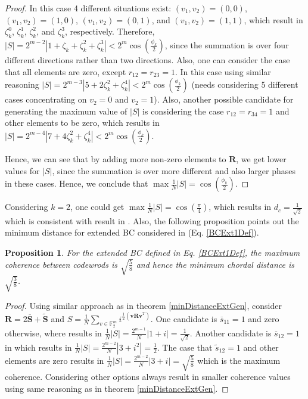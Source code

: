 \documentclass[lettersize,journal,onecolumn]{IEEEtran}
\newtheorem{proposition}{Proposition}
\begin{document}
\begin{proof}
In this case 4 different situations exist: $\left(v_1,v_2\right)=\left(0,0\right)$, $\left(v_1,v_2\right)=\left(1,0\right)$, $\left(v_1,v_2\right)=\left(0,1\right)$, and $\left(v_1,v_2\right)=\left(1,1\right)$, which result in $\zeta_k^0$, $\zeta_k^1$, $\zeta_k^2$, and $\zeta_k^3$, respectively. Therefore, $\left\lvert S \right\rvert = 2^{m-2}\left\lvert 1+\zeta_k+\zeta_k^2+\zeta_k^3 \right\rvert < 2^m \cos\left(\frac{\phi_k}{2}\right)$, since the summation is over four different directions rather than two directions. Also, one can consider the case that all elements are zero, except $r_{12}=r_{23}=1$. In this case using similar reasoning $\left\lvert S \right\rvert = 2^{m-3}\left\lvert 5+2\zeta_k^2+\zeta_k^4 \right\rvert < 2^m \cos\left(\frac{\phi_k}{2}\right)$ (needs considering 5 different cases concentrating on $v_2=0$ and $v_2=1$). Also, another possible candidate for generating the maximum value of $\left\lvert S \right\rvert$ is considering the case $r_{12}=r_{34}=1$ and other elements to be zero, which results in $\left\lvert S \right\rvert = 2^{m-4} \left\lvert 7+4\zeta_k^2+\zeta_k^4 \right\rvert< 2^m \cos\left(\frac{\phi_k}{2}\right)$.

Hence, we can see that by adding more non-zero elements to $\mathbf{R}$, we get lower values for $\left\lvert S \right\rvert$, since the summation is over more different and also larger phases in these cases. Hence, we conclude that ${\max}\frac{1}{N}\left\lvert S \right\rvert = \cos\left(\frac{\phi_k}{2}\right)$.
\end{proof}
Considering $k=2$, one could get $\max \frac{1}{N}\left\lvert S \right\rvert = \cos\left(\frac{\pi}{4}\right)$, which results in $d_{c} = \frac{1}{\sqrt{2}}$ which is consistent  with result in \cite{caledJSAC10, PitavalGrass20}. Also, the following proposition points out the minimum distance for extended BC considered in \cite{PitvalExtendedChirp21} (Eq. \ref{BCExt1Def}).
\begin{proposition}
	For the extended BC defined in Eq. \eqref{BCExt1Def}, the maximum coherence between codewrods is $\sqrt{\frac{5}{8}}$ and hence the minimum chordal distance is $\sqrt{\frac{3}{8}}$.
\end{proposition}
\begin{proof}
	Using similar approach as in theorem \ref{minDistanceExtGen}, consider $\mathbf{R}=2\overline{\mathbf{S}}+\widetilde{\mathbf{S}}$ and $S = \frac{1}{N}\sum_{v\in \mathbb{F}_2^m}{i^{\frac{1}{2} \left( \mathbf{v R v}^T \right)} }$. One candidate is $\overline{s}_{11}=1$ and zero otherwise, where results in $\frac{1}{N}\left\lvert S \right\rvert = \frac{2^{m-1}}{N}\left\lvert 1+i \right\rvert = \frac{1}{\sqrt{2}}$. Another candidate is $\overline{s}_{12}=1$ in which results in $\frac{1}{N}\left\lvert S \right\rvert=\frac{2^{m-2}}{N}\left\lvert 3+i^2 \right\rvert=\frac{1}{2}$. The case that $\widetilde{s}_{12}=1$ and other elements are zero results in $\frac{1}{N}\left\lvert S \right\rvert=\frac{2^{m-2}}{N}\left\lvert 3+i \right\rvert=\sqrt{\frac{5}{8}}$ which is the maximum coherence. Considering other options always result in smaller coherence values using same reasoning as in theorem \ref{minDistanceExtGen}. 
\end{proof}
\end{document}
